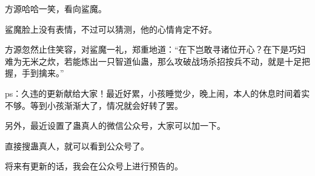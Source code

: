 \begin{this_body}
方源哈哈一笑，看向鲨魔。

鲨魔脸上没有表情，不过可以猜测，他的心情肯定不好。

方源忽然止住笑容，对鲨魔一礼，郑重地道：“在下岂敢寻诸位开心？在下是巧妇难为无米之炊，若能炼出一只智道仙蛊，那么攻破战场杀招按兵不动，就是十足把握，手到擒来。”

ps：久违的更新献给大家！最近好累，小孩睡觉少，晚上闹，本人的休息时间着实不够。等到小孩渐渐大了，情况就会好转了罢。

另外，最近设置了蛊真人的微信公众号，大家可以加一下。

直接搜蛊真人，就可以看到公众号了。

将来有更新的话，我会在公众号上进行预告的。

\end{this_body}

